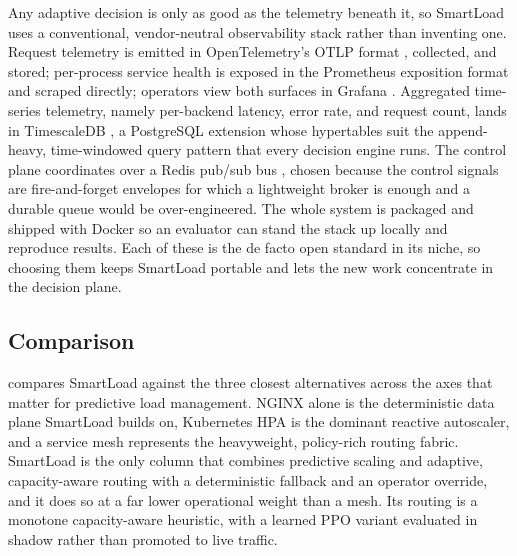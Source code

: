 Any adaptive decision is only as good as the telemetry beneath it, so SmartLoad
uses a conventional, vendor-neutral observability stack rather than inventing
one. Request telemetry is emitted in OpenTelemetry's OTLP format
\cite{opentelemetry}, collected, and stored; per-process service health is
exposed in the Prometheus exposition format \cite{prometheus} and scraped
directly; operators view both surfaces in Grafana \cite{grafana}. Aggregated
time-series telemetry, namely per-backend latency, error rate, and request
count, lands in TimescaleDB \cite{timescaledb}, a PostgreSQL extension whose
hypertables suit the append-heavy, time-windowed query pattern that every
decision engine runs. The control plane coordinates over a Redis pub/sub bus
\cite{carlson2013redis}, chosen because the control signals are fire-and-forget
envelopes for which a lightweight broker is enough and a durable queue would be
over-engineered. The whole system is packaged and shipped with Docker
\cite{merkel2014docker} so an evaluator can stand the stack up locally and
reproduce results. Each of these is the de facto open standard in its niche, so
choosing them keeps SmartLoad portable and lets the new work concentrate in the
decision plane.

\subsection{Comparison}
\label{lit:sec:market-comparison}

 compares SmartLoad against the three closest alternatives
across the axes that matter for predictive load management. NGINX alone is the
deterministic data plane SmartLoad builds on, Kubernetes HPA is the dominant
reactive autoscaler, and a service mesh represents the heavyweight, policy-rich
routing fabric. SmartLoad is the only column that combines predictive scaling
and adaptive, capacity-aware routing with a deterministic fallback and an
operator override, and it does so at a far lower operational weight than a mesh.
Its routing is a monotone capacity-aware heuristic, with a learned PPO variant
evaluated in shadow rather than promoted to live traffic.

